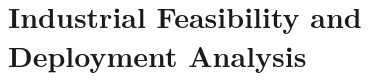 \chapter{Industrial Feasibility and Deployment Analysis}
\thispagestyle{fancy}
\vspace*{0cm} %





